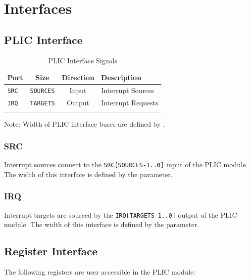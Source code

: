 \chapter{Interfaces}



\section{PLIC Interface} 


\begin{longtable}[c]{@{\extracolsep{\fill}}lccl@{\extracolsep{\fill}}}	
	\toprule
	\textbf{Port} & \textbf{Size} & \textbf{Direction} & \textbf{Description}\\
	\midrule 
	\endhead
	\texttt{SRC} & \texttt{SOURCES} & Input & Interrupt Sources\\
	\texttt{IRQ} & \texttt{TARGETS} & Output & Interrupt Requests \\
	\bottomrule 	
	\caption{PLIC Interface Signals} 
	\label{tab:PLICIF2}

\end{longtable}


Note: Width of PLIC interface buses are defined by
. 

\subsection{SRC}

Interrupt sources connect to the \texttt{SRC{[}SOURCES-1..0{]}} input of
the PLIC module. The width of this interface is defined by the \texttt{} parameter. 

\subsection{IRQ}

Interrupt targets are sourced by the \texttt{IRQ{[}TARGETS-1..0{]}}
output of the PLIC module. The width of this interface is defined by the
\texttt{} parameter.

\section{Register Interface}

The following registers are user accessible in the PLIC module:

